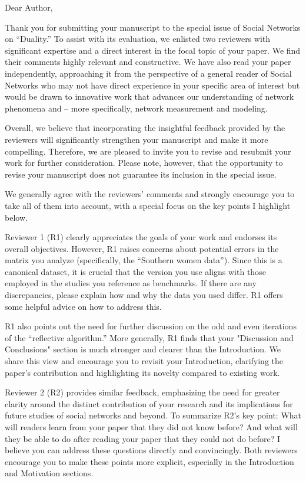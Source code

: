 \documentclass[]{letter}
\begin{document}
Dear Author,

Thank you for submitting your manuscript to the special issue of Social Networks on “Duality.” To assist with its evaluation, we enlisted two reviewers with significant expertise and a direct interest in the focal topic of your paper. We find their comments highly relevant and constructive. We have also read your paper independently, approaching it from the perspective of a general reader of Social Networks who may not have direct experience in your specific area of interest but would be drawn to innovative work that advances our understanding of network phenomena and – more specifically, network measurement and modeling.

Overall, we believe that incorporating the insightful feedback provided by the reviewers will significantly strengthen your manuscript and make it more compelling. Therefore, we are pleased to invite you to revise and resubmit your work for further consideration. Please note, however, that the opportunity to revise your manuscript does not guarantee its inclusion in the special issue.

We generally agree with the reviewers’ comments and strongly encourage you to take all of them into account, with a special focus on the key points I highlight below.

Reviewer 1 (R1) clearly appreciates the goals of your work and endorses its overall objectives. However, R1 raises concerns about potential errors in the matrix you analyze (specifically, the “Southern women data”). Since this is a canonical dataset, it is crucial that the version you use aligns with those employed in the studies you reference as benchmarks. If there are any discrepancies, please explain how and why the data you used differ. R1 offers some helpful advice on how to address this.

R1 also points out the need for further discussion on the odd and even iterations of the “reflective algorithm.” More generally, R1 finds that your "Discussion and Conclusions" section is much stronger and clearer than the Introduction. We share this view and encourage you to revisit your Introduction, clarifying the paper’s contribution and highlighting its novelty compared to existing work.

Reviewer 2 (R2) provides similar feedback, emphasizing the need for greater clarity around the distinct contribution of your research and its implications for future studies of social networks and beyond. To summarize R2's key point: What will readers learn from your paper that they did not know before? And what will they be able to do after reading your paper that they could not do before? I believe you can address these questions directly and convincingly. Both reviewers encourage you to make these points more explicit, especially in the Introduction and Motivation sections.
\end{document}
